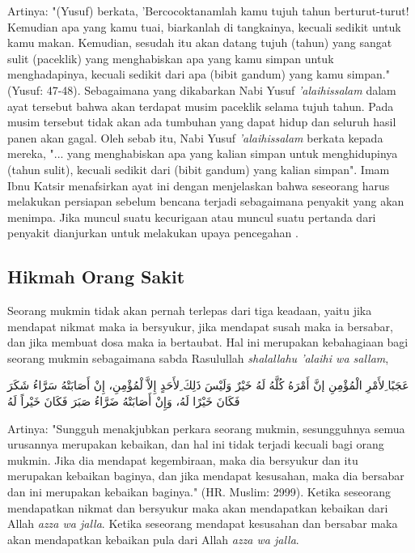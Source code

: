 Artinya: "(Yusuf) berkata, 'Bercocoktanamlah kamu tujuh tahun berturut-turut! Kemudian apa yang kamu tuai, biarkanlah di tangkainya, kecuali sedikit untuk kamu makan. Kemudian, sesudah itu akan datang tujuh (tahun) yang sangat sulit (paceklik) yang menghabiskan apa yang kamu simpan untuk menghadapinya, kecuali sedikit dari apa (bibit gandum) yang kamu simpan." (Yusuf: 47-48). Sebagaimana yang dikabarkan Nabi Yusuf \textit{'alaihissalam} dalam ayat tersebut bahwa akan terdapat musim paceklik selama tujuh tahun. Pada musim tersebut tidak akan ada tumbuhan yang dapat hidup dan seluruh hasil panen akan gagal. Oleh sebab itu, Nabi Yusuf \textit{'alaihissalam} berkata kepada mereka, "... yang menghabiskan apa yang kalian simpan untuk menghidupinya (tahun sulit), kecuali sedikit dari (bibit gandum) yang kalian simpan". Imam Ibnu Katsir menafsirkan ayat ini dengan menjelaskan bahwa seseorang harus melakukan persiapan sebelum bencana terjadi sebagaimana penyakit yang akan menimpa. Jika muncul suatu kecurigaan atau muncul suatu pertanda dari penyakit dianjurkan untuk melakukan upaya pencegahan \citep{Katsir2015}.

    \subsection{Hikmah Orang Sakit}
    Seorang mukmin tidak akan pernah terlepas dari tiga keadaan, yaitu jika mendapat nikmat maka ia bersyukur, jika mendapat susah maka ia bersabar, dan jika membuat dosa maka ia bertaubat. Hal ini merupakan kebahagiaan bagi seorang mukmin sebagaimana sabda Rasulullah \textit{shalallahu 'alaihi wa sallam}, 
    
    \begin{flushright}
        \begin{RLtext}
            عَجَبًا ِلأَمْرِ الْمُؤْمِنِ إنَّ أَمْرَهُ كُلَّهُ لَهُ خَيْرٌ وَلَيْسَ ذَلِكَ ِلأَحَدٍ إِلاَّ لْمُؤْمِنِ، إِنْ أَصَابَتْهُ سَرَّاءُ شَكَرَ فَكَانَ خَيْرًا لَهُ، وَإِنْ أَصَابَتْهُ ضَرَّاءُ صَبَرَ فَكَانَ خَيْراً لَهُ
        \end{RLtext}
    \end{flushright}

    Artinya: "Sungguh menakjubkan perkara seorang mukmin, sesungguhnya semua urusannya merupakan kebaikan, dan hal ini tidak terjadi kecuali bagi orang mukmin. Jika dia mendapat kegembiraan, maka dia bersyukur dan itu merupakan kebaikan baginya, dan jika mendapat kesusahan, maka dia bersabar dan ini merupakan kebaikan baginya." (HR. Muslim: 2999). Ketika seseorang mendapatkan nikmat dan bersyukur maka akan mendapatkan kebaikan dari Allah \textit{azza wa jalla}. Ketika seseorang mendapat kesusahan dan bersabar maka akan mendapatkan kebaikan pula dari Allah \textit{azza wa jalla}.

